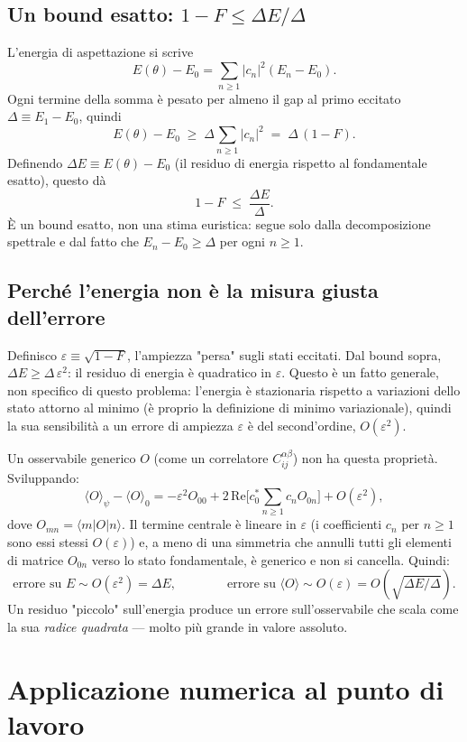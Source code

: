 \documentclass[11pt,a4paper]{article}
\begin{document}
\subsection{Un bound esatto: $1-F\le \Delta E/\Delta$}

L'energia di aspettazione si scrive
\[
E(\theta)-E_0 = \sum_{n\ge1}|c_n|^2(E_n-E_0).
\]
Ogni termine della somma è pesato per almeno il gap al primo eccitato $\Delta \equiv E_1-E_0$, quindi
\[
E(\theta)-E_0 \;\ge\; \Delta\sum_{n\ge1}|c_n|^2 \;=\; \Delta\,(1-F).
\]
Definendo $\Delta E \equiv E(\theta)-E_0$ (il residuo di energia rispetto al fondamentale esatto), questo dà
\[
\boxed{1-F \;\le\; \frac{\Delta E}{\Delta}.}
\]
È un bound esatto, non una stima euristica: segue solo dalla decomposizione spettrale e dal fatto che $E_n-E_0\ge\Delta$ per ogni $n\ge1$.

\subsection{Perché l'energia non è la misura giusta dell'errore}

Definisco $\varepsilon\equiv\sqrt{1-F}$, l'ampiezza "persa" sugli stati eccitati. Dal bound sopra, $\Delta E \ge \Delta\,\varepsilon^2$: il residuo di energia è quadratico in $\varepsilon$. Questo è un fatto generale, non specifico di questo problema: l'energia è stazionaria rispetto a variazioni dello stato attorno al minimo (è proprio la definizione di minimo variazionale), quindi la sua sensibilità a un errore di ampiezza $\varepsilon$ è del second'ordine, $O(\varepsilon^2)$.

Un osservabile generico $O$ (come un correlatore $C_{ij}^{\alpha\beta}$) non ha questa proprietà. Sviluppando:
\[
\langle O\rangle_\psi - \langle O\rangle_0 = -\varepsilon^2 O_{00} + 2\,\mathrm{Re}\Big[c_0^*\sum_{n\ge1}c_n O_{0n}\Big] + O(\varepsilon^2),
\]
dove $O_{mn}=\langle m|O|n\rangle$. Il termine centrale è lineare in $\varepsilon$ (i coefficienti $c_n$ per $n\ge1$ sono essi stessi $O(\varepsilon)$) e, a meno di una simmetria che annulli tutti gli elementi di matrice $O_{0n}$ verso lo stato fondamentale, è generico e non si cancella. Quindi:
\[
\text{errore su } E \sim O(\varepsilon^2)=\Delta E, \qquad\qquad \text{errore su } \langle O\rangle \sim O(\varepsilon) = O(\sqrt{\Delta E/\Delta}).
\]
Un residuo "piccolo" sull'energia produce un errore sull'osservabile che scala come la sua \emph{radice quadrata} — molto più grande in valore assoluto.

\section{Applicazione numerica al punto di lavoro}
\end{document}
